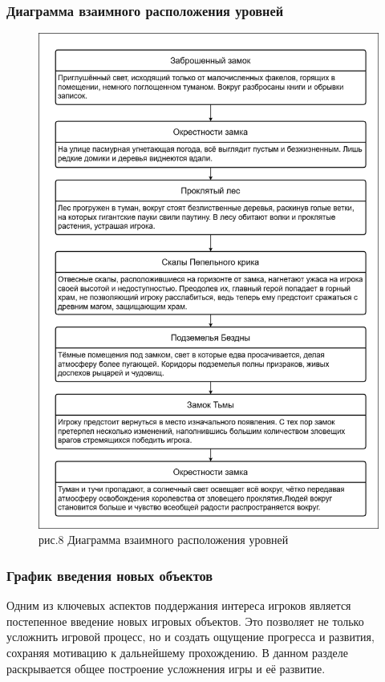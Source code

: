 \documentclass{article}
\begin{document}
\begin{itemize}
\subsubsection{Диаграмма взаимного расположения уровней}
\begin{figure}[h]
    \centering
    \includegraphics[width=283px\linewidth]{Взаимное расположение уровней(рис.8).png} \\ рис.8 Диаграмма взаимного расположения уровней
    \label{fig:artifact}
\end{figure}

\subsubsection{График введения новых объектов}

Одним из ключевых аспектов поддержания интереса игроков является постепенное введение новых игровых объектов. Это позволяет не только усложнить игровой процесс, но и создать ощущение прогресса и развития, сохраняя мотивацию к дальнейшему прохождению. В данном разделе раскрывается общее построение усложнения игры и её развитие.


\end{itemize}
\end{document}
